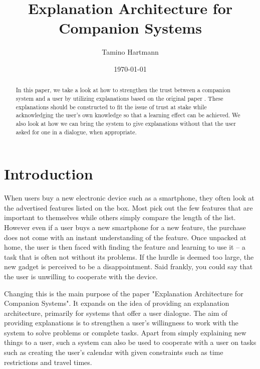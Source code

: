 \documentclass[a4paper]{article}
\begin{document}
\large

\title{Explanation Architecture for Companion Systems}
\author{Tamino Hartmann}
\date{\today}

\maketitle

\begin{abstract}
\normalsize
In this paper, we take a look at how to strengthen the trust between a companion system and a user by utilizing explanations based on the original paper \cite{origin}. These explanations should be constructed to fit the issue of trust at stake while acknowledging the user's own knowledge so that a learning effect can be achieved. We also look at how we can bring the system to give explanations without that the user asked for one in a dialogue, when appropriate.
\end{abstract}

\newpage

\section{Introduction}

When users buy a new electronic device such as a smartphone, they often look at the advertised features listed on the box. Most pick out the few features that are important to themselves while others simply compare the length of the list. However even if a user buys a new smartphone for a new feature, the purchase does not come with an instant understanding of the feature. Once unpacked at home, the user is then faced with finding the feature and learning to use it – a task that is often not without its problems. If the hurdle is deemed too large, the new gadget is perceived to be a disappointment. Said frankly, you could say that the user is unwilling to cooperate with the device.

Changing this is the main purpose of the paper "Explanation Architecture for Companion Systems"\cite{origin}. It expands on the idea of providing an explanation architecture, primarily for systems that offer a user dialogue. The aim of providing explanations is to strengthen a user's willingness to work with the system to solve problems or complete tasks. Apart from simply explaining new things to a user, such a system can also be used to cooperate with a user on tasks such as creating the user's calendar with given constraints such as time restrictions and travel times.
\end{document}
